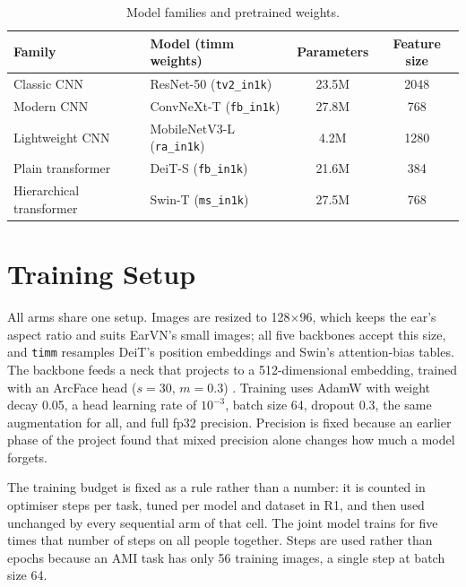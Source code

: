 \documentclass[12pt,a4paper]{report}
\begin{document}
\begin{table}[H]
\centering
\small
\caption{Model families and pretrained weights.}
\label{tab:models}
\begin{tabular}{|l|l|c|c|}
\hline
\textbf{Family} & \textbf{Model (timm weights)} & \textbf{Parameters} & \textbf{Feature size} \\
\hline
Classic CNN & ResNet-50 \cite{he2016resnet} (\texttt{tv2\_in1k}) & 23.5M & 2048 \\
Modern CNN & ConvNeXt-T \cite{liu2022convnext} (\texttt{fb\_in1k}) & 27.8M & 768 \\
Lightweight CNN & MobileNetV3-L \cite{howard2019mobilenetv3} (\texttt{ra\_in1k}) & 4.2M & 1280 \\
Plain transformer & DeiT-S \cite{touvron2021deit} (\texttt{fb\_in1k}) & 21.6M & 384 \\
Hierarchical transformer & Swin-T \cite{liu2021swin} (\texttt{ms\_in1k}) & 27.5M & 768 \\
\hline
\end{tabular}
\end{table}

\section{Training Setup}
All arms share one setup. Images are resized to 128$\times$96, which keeps the ear's aspect ratio and suits EarVN's small images; all five backbones accept this size, and \texttt{timm} resamples DeiT's position embeddings and Swin's attention-bias tables. The backbone feeds a neck that projects to a 512-dimensional embedding, trained with an ArcFace head ($s = 30$, $m = 0.3$) \cite{deng2019arcface}. Training uses AdamW \cite{loshchilov2019adamw} with weight decay 0.05, a head learning rate of $10^{-3}$, batch size 64, dropout 0.3, the same augmentation for all, and full fp32 precision. Precision is fixed because an earlier phase of the project found that mixed precision alone changes how much a model forgets.

The training budget is fixed as a rule rather than a number: it is counted in optimiser steps per task, tuned per model and dataset in R1, and then used unchanged by every sequential arm of that cell. The joint model trains for five times that number of steps on all people together. Steps are used rather than epochs because an AMI task has only 56 training images, a single step at batch size 64.
\end{document}
